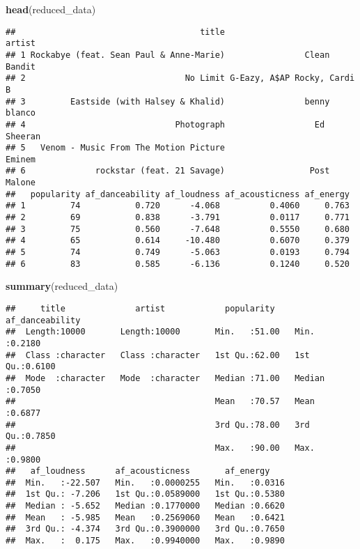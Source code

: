 \documentclass[
]{article}
\newenvironment{Shaded}{\begin{snugshade}}{\end{snugshade}}
\newcommand{\FunctionTok}[1]{\textcolor[rgb]{0.13,0.29,0.53}{\textbf{#1}}}
\newcommand{\NormalTok}[1]{#1}
\begin{document}
\begin{Shaded}
\begin{Highlighting}[]
\FunctionTok{head}\NormalTok{(reduced\_data)}
\end{Highlighting}
\end{Shaded}

\begin{verbatim}
##                                     title                      artist
## 1 Rockabye (feat. Sean Paul & Anne-Marie)                Clean Bandit
## 2                                No Limit G-Eazy, A$AP Rocky, Cardi B
## 3         Eastside (with Halsey & Khalid)                benny blanco
## 4                              Photograph                  Ed Sheeran
## 5   Venom - Music From The Motion Picture                      Eminem
## 6              rockstar (feat. 21 Savage)                 Post Malone
##   popularity af_danceability af_loudness af_acousticness af_energy
## 1         74           0.720      -4.068          0.4060     0.763
## 2         69           0.838      -3.791          0.0117     0.771
## 3         75           0.560      -7.648          0.5550     0.680
## 4         65           0.614     -10.480          0.6070     0.379
## 5         74           0.749      -5.063          0.0193     0.794
## 6         83           0.585      -6.136          0.1240     0.520
\end{verbatim}

\begin{Shaded}
\begin{Highlighting}[]
\FunctionTok{summary}\NormalTok{(reduced\_data)}
\end{Highlighting}
\end{Shaded}

\begin{verbatim}
##     title              artist            popularity    af_danceability 
##  Length:10000       Length:10000       Min.   :51.00   Min.   :0.2180  
##  Class :character   Class :character   1st Qu.:62.00   1st Qu.:0.6100  
##  Mode  :character   Mode  :character   Median :71.00   Median :0.7050  
##                                        Mean   :70.57   Mean   :0.6877  
##                                        3rd Qu.:78.00   3rd Qu.:0.7850  
##                                        Max.   :90.00   Max.   :0.9800  
##   af_loudness      af_acousticness       af_energy     
##  Min.   :-22.507   Min.   :0.0000255   Min.   :0.0316  
##  1st Qu.: -7.206   1st Qu.:0.0589000   1st Qu.:0.5380  
##  Median : -5.652   Median :0.1770000   Median :0.6620  
##  Mean   : -5.985   Mean   :0.2569060   Mean   :0.6421  
##  3rd Qu.: -4.374   3rd Qu.:0.3900000   3rd Qu.:0.7650  
##  Max.   :  0.175   Max.   :0.9940000   Max.   :0.9890
\end{verbatim}
\end{document}
